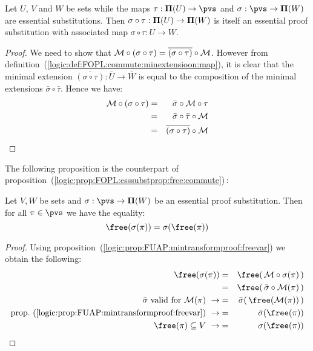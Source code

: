 \begin{prop}\label{logic:prop:FUAP:esssubstprop:composition}
Let $U$, $V$ and $W$ be sets while the maps
$\tau:{\bf\Pi}(U)\to\pvs$ and $\sigma:\pvs\to{\bf\Pi}(W)$ are
essential substitutions. Then $\sigma\circ\tau:{\bf\Pi}(U)\to{\bf
\Pi}(W)$ is itself an essential proof substitution with associated
map $\sigma\circ\tau:U\to W$.
\end{prop}
\begin{proof}
We need to show that ${\cal
M}\circ(\sigma\circ\tau)=\overline{(\sigma\circ\tau)}\circ{\cal M}$.
However from
definition~(\ref{logic:def:FOPL:commute:minextensioon:map}), it is
clear that the minimal extension
$\overline{(\sigma\circ\tau)}:\bar{U}\to\bar{W}$ is equal to the
composition of the minimal extensions $\bar{\sigma}\circ\bar{\tau}$.
Hence we have:
    \begin{eqnarray*}
    {\cal M}\circ(\sigma\circ\tau)
    &=&\bar{\sigma}\circ{\cal
    M}\circ\tau\\
    &=&\bar{\sigma}\circ\bar{\tau}\circ{\cal
    M}\\
    &=&\overline{(\sigma\circ\tau)}\circ{\cal
    M}\\
    \end{eqnarray*}
\end{proof}


The following proposition is the counterpart of
proposition~(\ref{logic:prop:FOPL:esssubstprop:free:commute})\,:

\begin{prop}\label{logic:prop:FUAP:esssubstprop:free:commute}
Let $V,W$ be sets and $\sigma:\pvs\to{\bf\Pi}(W)$ be an essential
proof substitution. Then for all $\pi\in\pvs$ we have the equality:
    \[
    \free(\sigma(\pi))=\sigma(\free(\pi))
    \]
\end{prop}
\begin{proof}
Using proposition~(\ref{logic:prop:FUAP:mintransformproof:freevar})
we obtain the following:
    \begin{eqnarray*}
    \free(\sigma(\pi))&=&\free(\,{\cal M}\circ\sigma(\pi)\,)\\
    &=&\free(\,\bar{\sigma}\circ{\cal M}(\pi)\,)\\
    \mbox{$\bar{\sigma}$ valid for ${\cal M}(\pi)$}\ \rightarrow
    &=&\bar{\sigma}(\,\free({\cal M}(\pi))\,)\\
    \mbox{prop.~(\ref{logic:prop:FUAP:mintransformproof:freevar})}\ \rightarrow
    &=&\bar{\sigma}(\free(\pi))\\
    \free(\pi)\subseteq V\ \rightarrow&=&\sigma(\free(\pi))
    \end{eqnarray*}
\end{proof}

